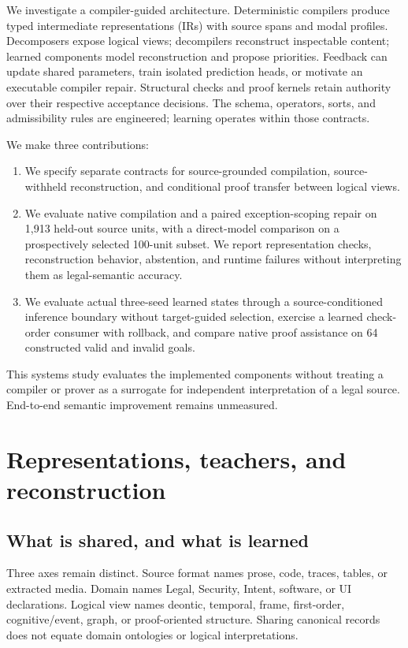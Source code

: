 \documentclass{article}
\begin{document}
We investigate a compiler-guided architecture. Deterministic compilers produce typed intermediate representations (IRs) with source spans and modal profiles. Decomposers expose logical views; decompilers reconstruct inspectable content; learned components model reconstruction and propose priorities. Feedback can update shared parameters, train isolated prediction heads, or motivate an executable compiler repair. Structural checks and proof kernels retain authority over their respective acceptance decisions. The schema, operators, sorts, and admissibility rules are engineered; learning operates within those contracts.

We make three contributions:
\begin{enumerate}
\item We specify separate contracts for source-grounded compilation, source-withheld reconstruction, and conditional proof transfer between logical views.
\item We evaluate native compilation and a paired exception-scoping repair on 1,913 held-out source units, with a direct-model comparison on a prospectively selected 100-unit subset. We report representation checks, reconstruction behavior, abstention, and runtime failures without interpreting them as legal-semantic accuracy.
\item We evaluate actual three-seed learned states through a source-conditioned inference boundary without target-guided selection, exercise a learned check-order consumer with rollback, and compare native proof assistance on 64 constructed valid and invalid goals.
\end{enumerate}
This systems study evaluates the implemented components without treating a compiler or prover as a surrogate for independent interpretation of a legal source. End-to-end semantic improvement remains unmeasured.

\section{Representations, teachers, and reconstruction}
\subsection{What is shared, and what is learned}
Three axes remain distinct. Source format names prose, code, traces, tables, or extracted media. Domain names Legal, Security, Intent, software, or UI declarations. Logical view names deontic, temporal, frame, first-order, cognitive/event, graph, or proof-oriented structure. Sharing canonical records does not equate domain ontologies or logical interpretations.
\end{document}
